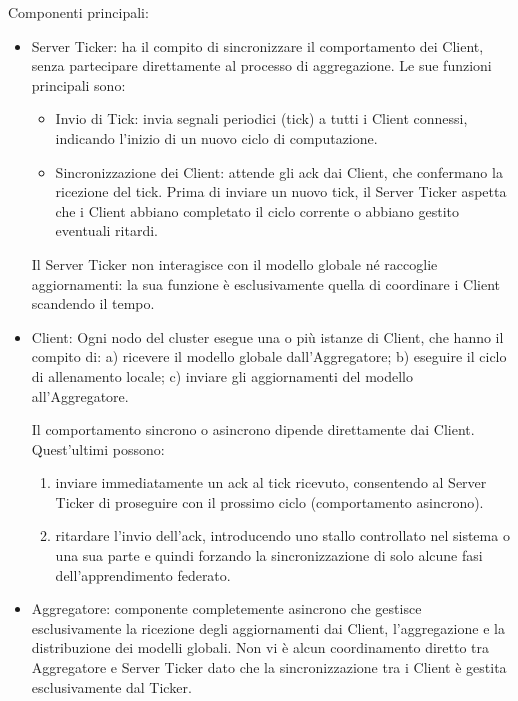 \documentclass[a4paper, oneside, openright]{report}
\begin{document}
Componenti principali:
\begin{itemize}
    \item Server Ticker: ha il compito di sincronizzare il comportamento dei Client, senza partecipare direttamente al processo di aggregazione. Le sue funzioni principali sono: 
    \begin{itemize}
        \item Invio di Tick: invia segnali periodici (tick) a tutti i Client connessi, indicando l’inizio di un nuovo ciclo di computazione.
        
        \item Sincronizzazione dei Client: attende gli ack dai Client, che confermano la ricezione del tick. Prima di inviare un nuovo tick, il Server Ticker aspetta che i Client abbiano completato il ciclo corrente o abbiano gestito eventuali ritardi.
    \end{itemize}

    Il Server Ticker non interagisce con il modello globale né raccoglie aggiornamenti: la sua funzione è esclusivamente quella di coordinare i Client scandendo il tempo.


    \item Client: Ogni nodo del cluster esegue una o più istanze di Client, che hanno il compito di: a) ricevere il modello globale dall’Aggregatore; b) eseguire il ciclo di allenamento locale; c) inviare gli aggiornamenti del modello all’Aggregatore.

    Il comportamento sincrono o asincrono dipende direttamente dai Client. Quest'ultimi possono:
    \begin{enumerate}
    \item inviare immediatamente un ack al tick ricevuto, consentendo al Server Ticker di proseguire con il prossimo ciclo (comportamento asincrono).
    \item ritardare l’invio dell’ack, introducendo uno stallo controllato nel sistema o una sua parte e quindi forzando la sincronizzazione di solo alcune fasi dell'apprendimento federato.
    \end{enumerate}

    \item Aggregatore: componente completemente asincrono che gestisce esclusivamente la ricezione degli aggiornamenti dai Client,  l'aggregazione e la distribuzione dei modelli globali. Non vi è alcun coordinamento diretto tra Aggregatore e Server Ticker dato che la sincronizzazione tra i Client è gestita esclusivamente dal Ticker.
\end{itemize}
\end{document}
